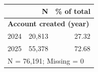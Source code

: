 \begin{tabular}{lrr}


\toprule


 & N & \% of total \\


\midrule


\multicolumn{3}{l}{\textbf{Account created (year)}}\\ 
\midrule
2024                &      20,813&       27.32\\
2025                &      55,378&       72.68\\
\midrule


\multicolumn{3}{l}{\footnotesize N =       76,191; Missing =            0}\\


\bottomrule


\end{tabular}


